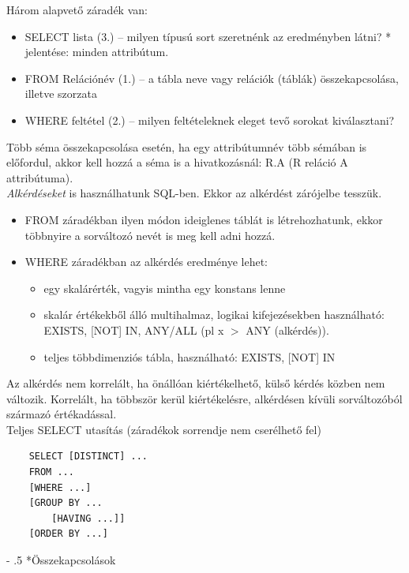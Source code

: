 \documentclass[tikz,12pt,margin=0px]{article}
\makeatletter
\renewcommand\paragraph{%
	\@startsection{paragraph}{4}{0mm}%
	{-\baselineskip}%
	{.5\baselineskip}%
	{\normalfont\normalsize\bfseries}}
\makeatother
\begin{document}
    \noindent Három alapvető záradék van:
	\begin{itemize}
		\item SELECT lista (3.) -- milyen típusú sort szeretnénk az eredményben látni? * jelentése: minden attribútum.
		\item FROM Relációnév (1.) -- a tábla neve vagy relációk (táblák) összekapcsolása, illetve szorzata
		\item WHERE feltétel (2.) -- milyen feltételeknek eleget tevő sorokat kiválasztani?
	\end{itemize}
	
\noindent Több séma összekapcsolása esetén, ha egy attribútumnév több sémában is előfordul, akkor kell hozzá a séma is a hivatkozásnál: R.A (R reláció A attribútuma). \\

	\noindent \textit{Alkérdéseket} is használhatunk SQL-ben. Ekkor az alkérdést zárójelbe tesszük.

	\begin{itemize}
		\item FROM záradékban ilyen módon ideiglenes táblát is létrehozhatunk, ekkor többnyire a sorváltozó nevét is meg kell adni hozzá.
		\item WHERE záradékban az alkérdés eredménye lehet:
		\begin{itemize}
			\item egy skalárérték, vagyis mintha egy konstans lenne
			\item skalár értékekből álló multihalmaz, logikai kifejezésekben használható: EXISTS, [NOT] IN, ANY/ALL (pl x $>$ ANY (alkérdés)).
			\item teljes többdimenziós tábla, használható: EXISTS, [NOT] IN
		\end{itemize}
	\end{itemize}

    \noindent Az alkérdés nem korrelált, ha önállóan kiértékelhető, külső kérdés közben nem változik. Korrelált, ha többször kerül kiértékelésre, alkérdésen kívüli sorváltozóból származó értékadással.\\

    \noindent Teljes SELECT utasítás (záradékok sorrendje nem cserélhető fel)
    \begin{verbatim}
    SELECT [DISTINCT] ...
    FROM ...
    [WHERE ...]
    [GROUP BY ...
        [HAVING ...]]
    [ORDER BY ...]
    \end{verbatim}

	\paragraph*{Összekapcsolások\\}
\end{document}
